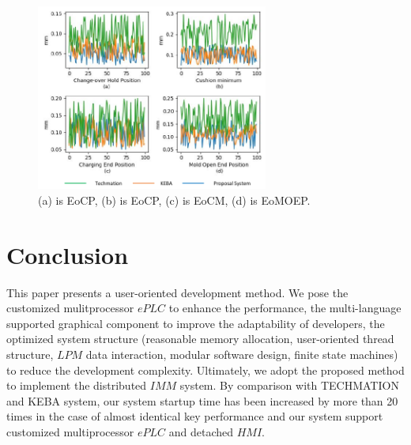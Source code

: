 \documentclass[journal,UTF8]{IEEEtran}
\begin{document}
\begin{figure}
	\centering
	\includegraphics[width=3in]{fig/Compare.pdf}
	\caption{(a) is EoCP, (b) is EoCP, (c) is EoCM, (d) is EoMOEP.}
	\label{fig:Compare}
\end{figure}
\section{Conclusion}
\label{conclusion}
This paper presents a user-oriented development method. We pose the customized mulitprocessor $ePLC$ to enhance the performance, the multi-language supported graphical component to improve the adaptability of developers, the optimized system structure (reasonable memory allocation, user-oriented thread structure, $LPM$ data interaction, modular software design, finite state machines) to reduce the development complexity. Ultimately, we adopt the proposed method to implement the distributed $IMM$ system. By comparison with TECHMATION and KEBA system, our system startup time has been increased by more than 20 times in the case of almost identical key performance and our system support customized multiprocessor $ePLC$ and detached $HMI$.





\ifCLASSOPTIONcaptionsoff
  \newpage
\fi





%
%
%
\end{document}
